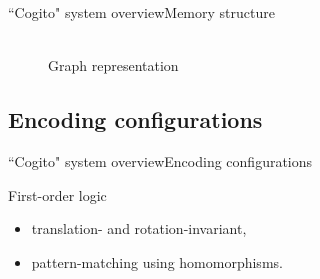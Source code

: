 \begin{frame}{``Cogito" system overview}{Memory structure}
\begin{figure}[ht]
\begin{minipage}[t]{0.45\textwidth}
    \\ Graph representation
  \end{minipage}
\end{figure}

\end{frame}

\subsection{Encoding configurations}

\begin{frame}{``Cogito" system overview}{Encoding configurations}

\begin{block}{First-order logic}
  \begin{itemize}
    \item translation- and rotation-invariant,
    \item pattern-matching using homomorphisms.
  \end{itemize}
\end{block}
\pause


\end{frame}
